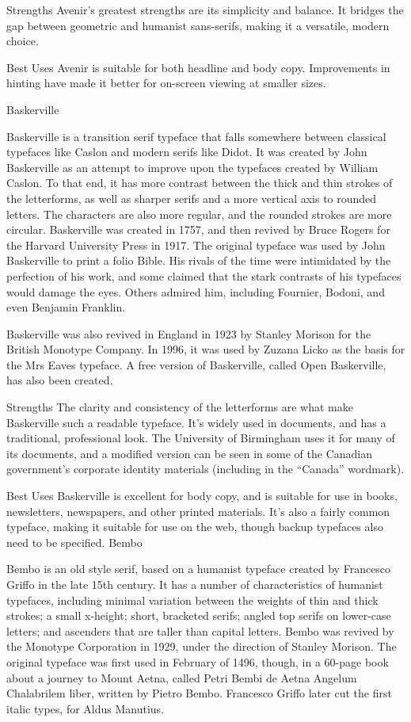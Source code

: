 \documentclass[12pt,a4paper,twocolumn]{book} %
\begin{document}
Strengths
Avenir’s greatest strengths are its simplicity and balance. It bridges the gap between geometric and humanist sans-serifs, making it a versatile, modern choice.

Best Uses
Avenir is suitable for both headline and body copy. Improvements in hinting have made it better for on-screen viewing at smaller sizes.

 
Baskerville

Baskerville is a transition serif typeface that falls somewhere between classical typefaces like Caslon and modern serifs like Didot. It was created by John Baskerville as an attempt to improve upon the typefaces created by William Caslon. To that end, it has more contrast between the thick and thin strokes of the letterforms, as well as sharper serifs and a more vertical axis to rounded letters. The characters are also more regular, and the rounded strokes are more circular.
Baskerville was created in 1757, and then revived by Bruce Rogers for the Harvard University Press in 1917. The original typeface was used by John Baskerville to print a folio Bible. His rivals of the time were intimidated by the perfection of his work, and some claimed that the stark contrasts of his typefaces would damage the eyes. Others admired him, including Fournier, Bodoni, and even Benjamin Franklin.

Baskerville was also revived in England in 1923 by Stanley Morison for the British Monotype Company. In 1996, it was used by Zuzana Licko as the basis for the Mrs Eaves typeface. A free version of Baskerville, called Open Baskerville, has also been created.

Strengths
The clarity and consistency of the letterforms are what make Baskerville such a readable typeface. It’s widely used in documents, and has a traditional, professional look. The University of Birmingham uses it for many of its documents, and a modified version can be seen in some of the Canadian government’s corporate identity materials (including in the “Canada” wordmark).

Best Uses
Baskerville is excellent for body copy, and is suitable for use in books, newsletters, newspapers, and other printed materials. It’s also a fairly common typeface, making it suitable for use on the web, though backup typefaces also need to be specified.
Bembo

Bembo is an old style serif, based on a humanist typeface created by Francesco Griffo in the late 15th century. It has a number of characteristics of humanist typefaces, including minimal variation between the weights of thin and thick strokes; a small x-height; short, bracketed serifs; angled top serifs on lower-case letters; and ascenders that are taller than capital letters.
Bembo was revived by the Monotype Corporation in 1929, under the direction of Stanley Morison. The original typeface was first used in February of 1496, though, in a 60-page book about a journey to Mount Aetna, called Petri Bembi de Aetna Angelum Chalabrilem liber, written by Pietro Bembo. Francesco Griffo later cut the first italic types, for Aldus Manutius.
\end{document}
